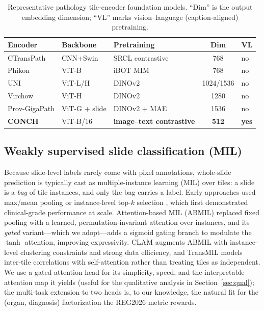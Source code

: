 \documentclass[11pt,a4paper]{article}
\begin{document}
\begin{table}[h]
\centering
\caption{Representative pathology tile-encoder foundation models. ``Dim'' is the output
embedding dimension; ``VL'' marks vision--language (caption-aligned) pretraining.}
\label{tab:encoders}
\begin{tabular}{lllcl}
\toprule
Encoder & Backbone & Pretraining & Dim & VL \\
\midrule
CTransPath \cite{wang2022ctranspath} & CNN+Swin & SRCL contrastive & 768 & no \\
Phikon \cite{filiot2023phikon}       & ViT-B & iBOT MIM & 768 & no \\
UNI \cite{chen2024uni}               & ViT-L/H & DINOv2 & 1024/1536 & no \\
Virchow \cite{vorontsov2024virchow}  & ViT-H & DINOv2 & 1280 & no \\
Prov-GigaPath \cite{xu2024provgigapath} & ViT-G + slide & DINOv2 + MAE & 1536 & no \\
\textbf{CONCH} \cite{lu2024conch}    & ViT-B/16 & \textbf{image--text contrastive} & \textbf{512} & \textbf{yes} \\
\bottomrule
\end{tabular}
\end{table}

\subsection{Weakly supervised slide classification (MIL)}
Because slide-level labels rarely come with pixel annotations, whole-slide prediction is
typically cast as multiple-instance learning (MIL) over tiles: a slide is a \emph{bag} of tile
instances, and only the bag carries a label. Early approaches used max/mean pooling or
instance-level top-$k$ selection \cite{campanella2019clinical}, which first demonstrated
clinical-grade performance at scale. Attention-based MIL (ABMIL) \cite{ilse2018attention}
replaced fixed pooling with a learned, permutation-invariant attention over instances, and its
\emph{gated} variant---which we adopt---adds a sigmoid gating branch to modulate the $\tanh$
attention, improving expressivity. CLAM \cite{lu2021clam} augments ABMIL with instance-level
clustering constraints and strong data efficiency, and TransMIL \cite{shao2021transmil} models
inter-tile correlations with self-attention rather than treating tiles as independent. We use a
gated-attention head for its simplicity, speed, and the interpretable attention map it yields
(useful for the qualitative analysis in Section~\ref{sec:qual}); the multi-task extension to two
heads is, to our knowledge, the natural fit for the (organ, diagnosis) factorization the REG2026
metric rewards.
\end{document}
